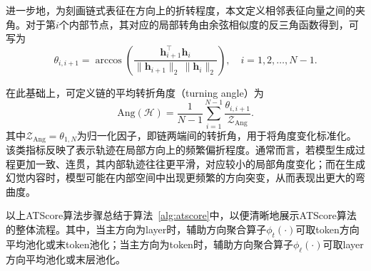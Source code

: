 进一步地，为刻画链式表征在方向上的折转程度，本文定义相邻表征向量之间的夹角。对于第$i$个内部节点，其对应的局部转角由余弦相似度的反三角函数得到，可写为
\begin{equation}
\theta_{i,i+1}
=
\arccos
\left(
\frac{
\mathbf{h}_{i+1}^{\top}\mathbf{h}_{i}
}{
\|\mathbf{h}_{i+1}\|_2\,\|\mathbf{h}_{i}\|_2
}
\right),
\quad i=1,2,\dots,N-1.
\end{equation}

在此基础上，可定义链的平均转折角度（turning angle）为
\begin{equation}
\mathrm{Ang}(\mathcal{H})
=
\frac{1}{N-1}
\sum_{i=1}^{N-1}\frac{\theta_{i,i+1}}{\mathcal{Z}_\mathrm{Ang}}.
\label{eq:chain_angle}
\end{equation}
其中$\mathcal{Z}_\mathrm{Ang}=\theta_{1,N}$为归一化因子，即链两端间的转折角，用于将角度变化标准化。该类指标反映了表示轨迹在局部方向上的频繁偏折程度。通常而言，若模型生成过程更加一致、连贯，其内部轨迹往往更平滑，对应较小的局部角度变化；而在生成幻觉内容时，模型可能在内部空间中出现更频繁的方向突变，从而表现出更大的弯曲度。

以上ATScore算法步骤总结于算法~\ref{alg:atscore}中，以便清晰地展示ATScore算法的整体流程。其中，当主方向为layer时，辅助方向聚合算子$\phi_t(\cdot)$可取token方向平均池化或末token池化；当主方向为token时，辅助方向聚合算子$\phi_{\ell}(\cdot)$可取layer方向平均池化或末层池化。

